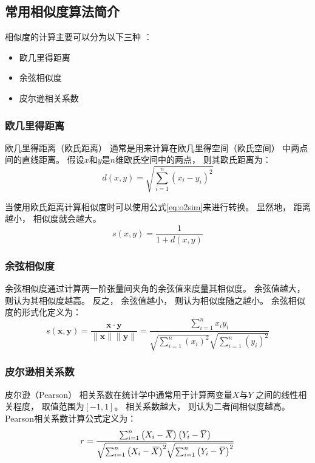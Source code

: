 \subsection{常用相似度算法简介}

相似度的计算主要可以分为以下三种
\cite{heJiYuJuanJiShenJingWangLuoDeYinLeTuiJianXiTong2019}：
\begin{itemize}
    \item 欧几里得距离
    \item 余弦相似度
    \item 皮尔逊相关系数
\end{itemize}

\subsubsection{欧几里得距离}

欧几里得距离（欧氏距离）
通常是用来计算在欧几里得空间（欧氏空间）
中两点间的直线距离。
假设$x$和$y$是$n$维欧氏空间中的两点，
则其欧氏距离为：
\begin{equation}
    d(x,y)=\sqrt{\sum_{i=1}^n\left(x_i-y_i\right)^2}
\end{equation}

当使用欧氏距离计算相似度时可以使用公式\cref{eq:o2sim}来进行转换。
显然地，
距离越小，
相似度就会越大。
\begin{equation}
    \label{eq:o2sim}
    s(x,y)=\frac{1}{1+d(x,y)}
\end{equation}

\subsubsection{余弦相似度}

余弦相似度通过计算两一阶张量间夹角的余弦值来度量其相似度。
余弦值越大，
则认为其相似度越高。
反之，
余弦值越小，
则认为相似度随之越小。
余弦相似度的形式化定义为：
\begin{equation}
    s(\mathbf{x},\mathbf{y})=
    \frac{\mathbf{x}\cdot\mathbf{y}}{\lVert\mathbf{x}\rVert\lVert\mathbf{y}\rVert}
    =\frac{\sum_{i=1}^nx_iy_i}{\sqrt{\sum_{i=1}^n\left(x_i\right)^2}\sqrt{\sum_{i=1}^n\left(y_i\right)^2}}
\end{equation}

\subsubsection{皮尔逊相关系数}

皮尔逊（Pearson）
相关系数在统计学中通常用于计算两变量$X$与$Y$
之间的线性相关程度，
取值范围为$\left[-1,1\right]$。
相关系数越大，
则认为二者间相似度越高。
Pearson相关系数计算公式定义为：
\begin{equation}
    r=\frac{\sum_{i=1}^n\left(X_i-\overbari{X}\right)\left(Y_i-\overbar{Y}\right)}{\sqrt{\sum_{i=1}^n\left(X_i-\overbari{X}\right)^2}\sqrt{\sum_{i=1}^n\left(Y_i-\overbar{Y}\right)^2}}
\end{equation}
